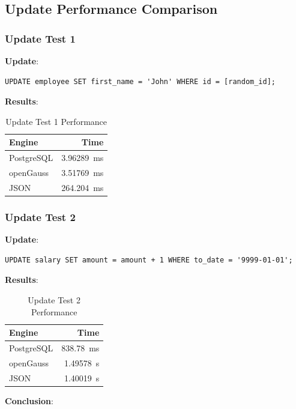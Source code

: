 \documentclass[14pt,a4paper]{article}
\begin{document}
    \subsection{Update Performance Comparison}
    \subsubsection{Update Test 1}
    \textbf{Update}:
    \begin{verbatim}
UPDATE employee SET first_name = 'John' WHERE id = [random_id];
    \end{verbatim}
    \textbf{Results}:
    \begin{table}[H]
        \centering        
        \begin{tabular}{lr}
            \toprule
            \textbf{Engine} & \textbf{Time}\\
            \midrule
            PostgreSQL & \qty{3.96289}{\milli\second}\\
            openGauss & \qty{3.51769}{\milli\second}\\
            JSON & \qty{264.204}{\milli\second}\\
            \bottomrule
        \end{tabular}
        \caption{Update Test 1 Performance}
    \end{table}
    
    \subsubsection{Update Test 2}
    \textbf{Update}:
    \begin{verbatim}
UPDATE salary SET amount = amount + 1 WHERE to_date = '9999-01-01';
    \end{verbatim}
    \textbf{Results}:
    \begin{table}[H]
        \centering        
        \begin{tabular}{lr}
            \toprule
            \textbf{Engine} & \textbf{Time}\\
            \midrule
            PostgreSQL & \qty{838.78}{\milli\second}\\
            openGauss & \qty{1.49578}{\second}\\
            JSON & \qty{1.40019}{\second}\\
            \bottomrule
        \end{tabular}
        \caption{Update Test 2 Performance}
    \end{table}
    \textbf{Conclusion}:
    
\end{document}
